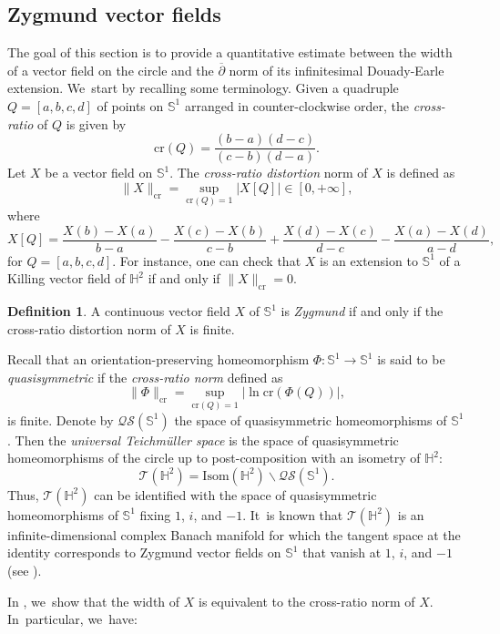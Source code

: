 \documentclass[10pt]{amsart}
\theoremstyle{plain}
\theoremstyle{definition}
\newtheorem{defi}[cor]{Definition}
\begin{document}
\subsection{Zygmund vector fields}
The goal of this section is to provide a quantitative estimate between the width of a vector field on the circle and the $\overline{\partial}$ norm of its infinitesimal Douady-Earle extension. We~start by recalling some terminology. Given a quadruple $Q=[a,b,c,d]$ of points on $\mathbb{S}^1$ arranged in counter-clockwise order, the \emph{cross-ratio} of $Q$ is given by
\[
\mathrm{cr}(Q)=\frac{ (b-a)(d-c) }{ (c-b)(d-a) }.
\]
Let $X$ be a vector field on $\mathbb{S}^1$. The \emph{cross-ratio distortion} norm of $X$ is defined as
\[
\lVert X \rVert_\mathrm{cr}=\sup_{\mathrm{cr}(Q)=1}\vert X[Q]\vert \in[0,+\infty],
\]
where
\[
X[Q]=\frac{X(b)-X(a)}{b-a}-\frac{X(c)-X(b)}{c-b}+\frac{X(d)-X(c)}{d-c}-\frac{X(a)-X(d)}{a-d},
\]
for $Q=[a,b,c,d]$. For instance, one can check that $X$ is an extension to $\mathbb{S}^1$ of a Killing vector field of $\mathbb{H}^2$ if and only if $\lVert X\rVert_\mathrm{cr}=0$.

\begin{defi}
A continuous vector field $X$ of $\mathbb{S}^1$ is \emph{Zygmund} if and only if the cross-ratio distortion norm of $X$ is finite.
\end{defi}
Recall that an orientation-preserving homeomorphism $\Phi:\mathbb{S}^1\to\mathbb{S}^1$ is said to be \emph{quasisymmetric} if the \emph{cross-ratio norm} defined as
\[
\lVert \Phi \rVert_\mathrm{cr}=\sup_{\mathrm{cr}(Q)=1} \vert{\ln\mathrm{cr}\left(\Phi(Q)\right)} \vert ,
\]
is finite. Denote by $\mathcal{QS}(\mathbb{S}^1)$ the space of quasisymmetric homeomorphisms of $\mathbb{S}^1$. Then the \emph{universal Teichmüller space} is the space of quasisymmetric homeomorphisms of the circle up to post-composition with an isometry of $\mathbb{H}^2$:
\[
\mathcal{T}(\mathbb{H}^2)=\mathrm{Isom}(\mathbb{H}^2)\backslash \mathcal{QS}(\mathbb{S}^1).
\]
Thus, $\mathcal{T}(\mathbb{H}^2)$ can be identified with the space of quasisymmetric homeomorphisms of $\mathbb{S}^1$ fixing $1$, $i$, and $-1$. It~is known that $\mathcal{T}(\mathbb{H}^2)$ is an infinite-dimensional complex Banach manifold for which the tangent space at the identity corresponds to Zygmund vector fields on $\mathbb{S}^1$ that vanish at $1$, $i$, and $-1$ (see \cite{Gardiner1999QuasiconformalTT}).

In \cite[Th.\,1.3]{diaf2023Infearth}, we~show that the width of $X$ is equivalent to the cross-ratio norm of $X$. In~particular, we~have:
\end{document}
